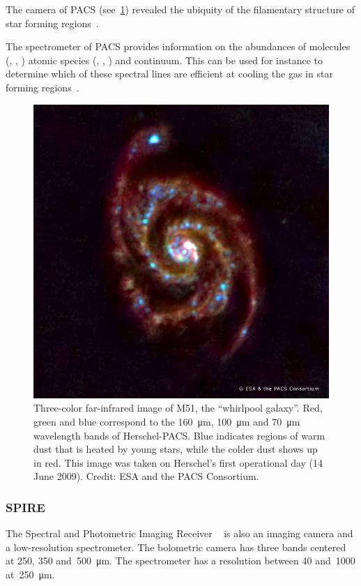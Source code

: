 The camera of PACS (see~\cref{fig:m51_pacs_composite}) revealed the ubiquity of the filamentary structure of star forming regions~\parencite{2010A&A...518L.100M}.

The spectrometer of PACS provides information on the abundances of molecules
(, , ) atomic species (, , ) and continuum.
This can be used for instance to determine which of these spectral lines are efficient at cooling the gas in star forming regions~\parencite{2013A&A...552A.141K}.

\begin{figure}
    \centering
    \includegraphics[width=.6\textwidth]{m51_pacs_composite}
    \caption{
        Three-color far-infrared image of M51, the ``whirlpool galaxy''.
        Red, green and blue correspond to the \SI{160}{\micro\meter}, \SI{100}{\micro\meter} and \SI{70}{\micro\meter} wavelength bands
        of Herschel-PACS.
        Blue indicates regions of warm dust that is heated by young stars, while the colder dust shows up in red.
        This image was taken on Herschel's first operational day (14 June 2009).
        Credit: ESA and the PACS Consortium.
    }
    \label{fig:m51_pacs_composite}
\end{figure}

\subsubsection{SPIRE}
The Spectral and Photometric Imaging Receiver%
~\cite{griffin2010herschel}
is also an imaging camera and a low-resolution spectrometer.
The bolometric camera has three bands centered at \num{250}, \num{350} and~\SI{500}{\micro\meter}.
The spectrometer has a resolution between \num{40} and~\num{1000} at~\SI{250}{\micro\meter}.

